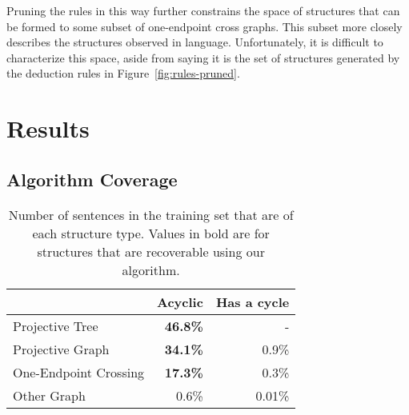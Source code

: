 Pruning the rules in this way further constrains the space of structures that can be formed to some subset of one-endpoint cross graphs.
This subset more closely describes the structures observed in language.
Unfortunately, it is difficult to characterize this space, aside from saying it is the set of structures generated by the deduction rules in Figure~\ref{fig:rules-pruned}.






\section{Results}

\subsection{Algorithm Coverage}

\begin{table}
  \centering
  \begin{tabular}{|lrr|}
    \hline
      & Acyclic & Has a cycle \\
    \hline
    \hline
    Projective Tree & \textbf{46.8\%} & - \\
    Projective Graph & \textbf{34.1\%} & 0.9\% \\
    One-Endpoint Crossing & \textbf{17.3\%} & 0.3\% \\
    Other Graph & 0.6\% & 0.01\% \\
    \hline
  \end{tabular}
  \caption[Number of sentences in the training set that are of each structure type.]{ \label{tab:structures}
    Number of sentences in the training set that are of each structure type.
    Values in bold are for structures that are recoverable using our algorithm.
  }
\end{table}

